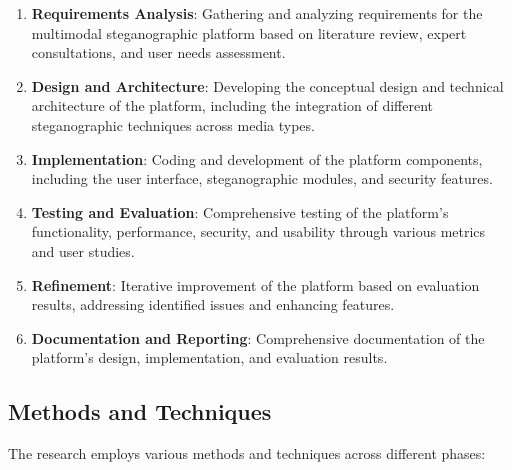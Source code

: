 \documentclass[12pt, a4paper, oneside]{book}
\begin{document}
\begin{enumerate}
    \item \textbf{Requirements Analysis}: Gathering and analyzing requirements for the multimodal steganographic platform based on literature review, expert consultations, and user needs assessment.

    \item \textbf{Design and Architecture}: Developing the conceptual design and technical architecture of the platform, including the integration of different steganographic techniques across media types.

    \item \textbf{Implementation}: Coding and development of the platform components, including the user interface, steganographic modules, and security features.

    \item \textbf{Testing and Evaluation}: Comprehensive testing of the platform's functionality, performance, security, and usability through various metrics and user studies.

    \item \textbf{Refinement}: Iterative improvement of the platform based on evaluation results, addressing identified issues and enhancing features.

    \item \textbf{Documentation and Reporting}: Comprehensive documentation of the platform's design, implementation, and evaluation results.
\end{enumerate}

\subsection{Methods and Techniques}
The research employs various methods and techniques across different phases:
\end{document}
